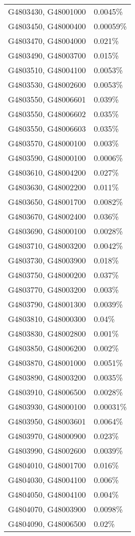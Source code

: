 \begin{longtable}[]{@{}ll@{}}
G4803430, G48001000 & 0.0045\% \\
G4803450, G48000400 & 0.00059\% \\
G4803470, G48004000 & 0.021\% \\
G4803490, G48003700 & 0.015\% \\
G4803510, G48004100 & 0.0053\% \\
G4803530, G48002600 & 0.0053\% \\
G4803550, G48006601 & 0.039\% \\
G4803550, G48006602 & 0.035\% \\
G4803550, G48006603 & 0.035\% \\
G4803570, G48000100 & 0.003\% \\
G4803590, G48000100 & 0.0006\% \\
G4803610, G48004200 & 0.027\% \\
G4803630, G48002200 & 0.011\% \\
G4803650, G48001700 & 0.0082\% \\
G4803670, G48002400 & 0.036\% \\
G4803690, G48000100 & 0.0028\% \\
G4803710, G48003200 & 0.0042\% \\
G4803730, G48003900 & 0.018\% \\
G4803750, G48000200 & 0.037\% \\
G4803770, G48003200 & 0.003\% \\
G4803790, G48001300 & 0.0039\% \\
G4803810, G48000300 & 0.04\% \\
G4803830, G48002800 & 0.001\% \\
G4803850, G48006200 & 0.002\% \\
G4803870, G48001000 & 0.0051\% \\
G4803890, G48003200 & 0.0035\% \\
G4803910, G48006500 & 0.0028\% \\
G4803930, G48000100 & 0.00031\% \\
G4803950, G48003601 & 0.0064\% \\
G4803970, G48000900 & 0.023\% \\
G4803990, G48002600 & 0.0039\% \\
G4804010, G48001700 & 0.016\% \\
G4804030, G48004100 & 0.006\% \\
G4804050, G48004100 & 0.004\% \\
G4804070, G48003900 & 0.0098\% \\
G4804090, G48006500 & 0.02\% \\

\end{longtable}
